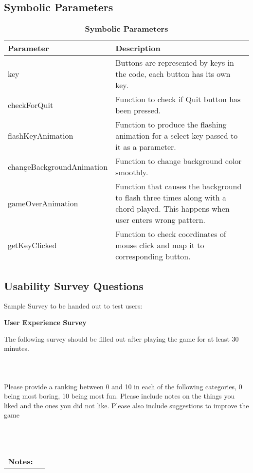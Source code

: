 \documentclass[12pt, titlepage]{article}
\begin{document}
\subsection{Symbolic Parameters}
\begin{table}[h]
\caption{\bf Symbolic Parameters}
\begin{tabularx}{\textwidth}{p{6cm}X}
\toprule {\bf Parameter} & {\bf Description}\\
\midrule
key & Buttons are represented by keys in the code, each button has its own key.\\
checkForQuit & Function to check if Quit button has been pressed.\\
flashKeyAnimation & Function to produce the flashing animation for a select key passed to it as a parameter.\\
changeBackgroundAnimation & Function to change background color smoothly.\\
gameOverAnimation & Function that causes the background to flash three times along with a chord played. This happens when user enters wrong pattern.\\
getKeyClicked & Function to check coordinates of mouse click and map it to corresponding button.\\
\bottomrule
\end{tabularx}
\end{table}

\subsection{Usability Survey Questions}
Sample Survey to be handed out to test users:
\begin{mdframed}[linewidth=1pt]
\begin{center}
{\bf \large User Experience Survey}\\[\baselineskip]
\end{center}
\noindent The following survey should be filled out after playing the game for at least 30 minutes.\\
\\
\\
\\
\noindent Please provide a ranking between 0 and 10 in each of the following categories, 0 being most boring, 10 being most fun.  Please include notes on the things you liked and the ones you did not like. Please also include suggestions to improve the game\\[\baselineskip]
\noindent \begin{tabularx}{\textwidth}{@{}p{3.5cm}X@{}}
\noindent {\bf Entertainment:}\\
\\
\noindent {\bf Difficulty:}\\
\\
\noindent {\bf Appearance:}\\
\\
\noindent {\bf Sounds:}\\
\\
\\
{\bf Notes:} & \\[5\baselineskip]
\end{tabularx}
\end{mdframed}
\end{document}
